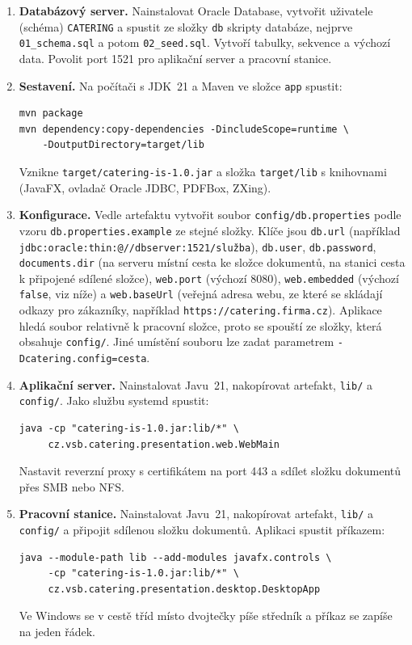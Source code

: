 \begin{enumerate}[itemsep=2pt]
  \item \textbf{Databázový server.} Nainstalovat Oracle Database, vytvořit uživatele (schéma) \texttt{CATERING} a spustit ze složky \texttt{db} skripty databáze, nejprve \texttt{01\_schema.sql} a potom \texttt{02\_seed.sql}. Vytvoří tabulky, sekvence a výchozí data. Povolit port 1521 pro aplikační server a pracovní stanice.
  \item \textbf{Sestavení.} Na počítači s JDK~21 a Maven ve složce \texttt{app} spustit:
\begin{verbatim}
mvn package
mvn dependency:copy-dependencies -DincludeScope=runtime \
    -DoutputDirectory=target/lib
\end{verbatim}
Vznikne \texttt{target/catering-is-1.0.jar} a složka \texttt{target/lib} s knihovnami (JavaFX, ovladač Oracle JDBC, PDFBox, ZXing).
  \item \textbf{Konfigurace.} Vedle artefaktu vytvořit soubor \texttt{config/db.properties} podle vzoru \texttt{db.properties.example} ze stejné složky. Klíče jsou \texttt{db.url} (například \texttt{jdbc:oracle:thin:@//dbserver:1521/služba}), \texttt{db.user}, \texttt{db.password}, \texttt{documents.dir} (na serveru místní cesta ke složce dokumentů, na stanici cesta k připojené sdílené složce), \texttt{web.port} (výchozí 8080), \texttt{web.embedded} (výchozí \texttt{false}, viz níže) a \texttt{web.baseUrl} (veřejná adresa webu, ze které se skládají odkazy pro zákazníky, například \texttt{https://catering.firma.cz}). Aplikace hledá soubor relativně k pracovní složce, proto se spouští ze složky, která obsahuje \texttt{config/}. Jiné umístění souboru lze zadat parametrem \texttt{-Dcatering.config=cesta}.
  \item \textbf{Aplikační server.} Nainstalovat Javu~21, nakopírovat artefakt, \texttt{lib/} a \texttt{config/}. Jako službu systemd spustit:
\begin{verbatim}
java -cp "catering-is-1.0.jar:lib/*" \
     cz.vsb.catering.presentation.web.WebMain
\end{verbatim}
Nastavit reverzní proxy s certifikátem na port 443 a sdílet složku dokumentů přes SMB nebo NFS.
  \item \textbf{Pracovní stanice.} Nainstalovat Javu~21, nakopírovat artefakt, \texttt{lib/} a \texttt{config/} a připojit sdílenou složku dokumentů. Aplikaci spustit příkazem:
\begin{verbatim}
java --module-path lib --add-modules javafx.controls \
     -cp "catering-is-1.0.jar:lib/*" \
     cz.vsb.catering.presentation.desktop.DesktopApp
\end{verbatim}
Ve Windows se v cestě tříd místo dvojtečky píše středník a příkaz se zapíše na jeden řádek.
\end{enumerate}

